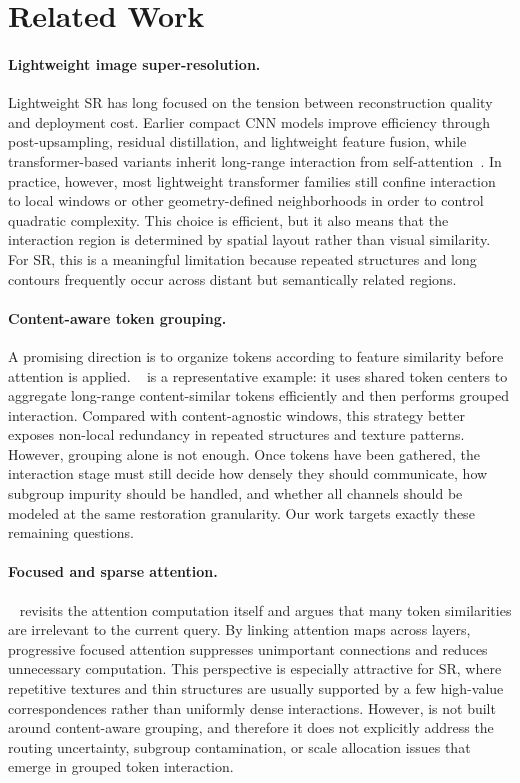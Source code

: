 \section{Related Work}
\label{sec:related}

\paragraph{Lightweight image super-resolution.}
Lightweight SR has long focused on the tension between reconstruction quality and deployment cost. Earlier compact CNN models improve efficiency through post-upsampling, residual distillation, and lightweight feature fusion, while transformer-based variants inherit long-range interaction from self-attention~\cite{vaswani2017attention}. In practice, however, most lightweight transformer families still confine interaction to local windows or other geometry-defined neighborhoods in order to control quadratic complexity. This choice is efficient, but it also means that the interaction region is determined by spatial layout rather than visual similarity. For SR, this is a meaningful limitation because repeated structures and long contours frequently occur across distant but semantically related regions.

\paragraph{Content-aware token grouping.}
A promising direction is to organize tokens according to feature similarity before attention is applied. \baseline{}~\cite{liu2025catanet} is a representative example: it uses shared token centers to aggregate long-range content-similar tokens efficiently and then performs grouped interaction. Compared with content-agnostic windows, this strategy better exposes non-local redundancy in repeated structures and texture patterns. However, grouping alone is not enough. Once tokens have been gathered, the interaction stage must still decide how densely they should communicate, how subgroup impurity should be handled, and whether all channels should be modeled at the same restoration granularity. Our work targets exactly these remaining questions.

\paragraph{Focused and sparse attention.}
\pft{}~\cite{long2025pft} revisits the attention computation itself and argues that many token similarities are irrelevant to the current query. By linking attention maps across layers, progressive focused attention suppresses unimportant connections and reduces unnecessary computation. This perspective is especially attractive for SR, where repetitive textures and thin structures are usually supported by a few high-value correspondences rather than uniformly dense interactions. However, \pft{} is not built around content-aware grouping, and therefore it does not explicitly address the routing uncertainty, subgroup contamination, or scale allocation issues that emerge in grouped token interaction.

